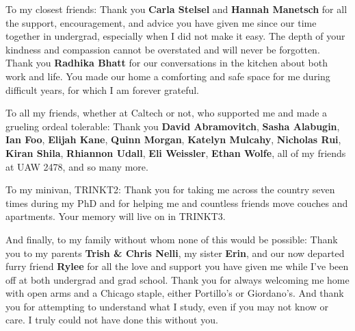 \documentclass[11pt]{caltech_thesis}
\begin{document}
\begin{acknowledgements}
  To my closest friends: Thank you \textbf{Carla Stelsel} and \textbf{Hannah
  Manetsch} for all the support, encouragement, and advice you have given me
  since our time together in undergrad, especially when I did not make it easy.
  The depth of your kindness and compassion cannot be overstated and will never
  be forgotten. Thank you \textbf{Radhika Bhatt} for our conversations in the
  kitchen about both work and life. You made our home a comforting and safe
  space for me during difficult years, for which I am forever grateful.

  To all my friends, whether at Caltech or not, who supported me and made a
  grueling ordeal tolerable: Thank you \textbf{David Abramovitch}, \textbf{Sasha
  Alabugin}, \textbf{Ian Foo}, \textbf{Elijah Kane}, \textbf{Quinn Morgan},
  \textbf{Katelyn Mulcahy}, \textbf{Nicholas Rui}, \textbf{Kiran Shila},
  \textbf{Rhiannon Udall}, \textbf{Eli Weissler}, \textbf{Ethan Wolfe}, all of
  my friends at UAW 2478, and so many more.

  To my minivan, TRINKT2: Thank you for taking me across the country seven times
  during my PhD and for helping me and countless friends move couches and
  apartments. Your memory will live on in TRINKT3.

  And finally, to my family without whom none of this would be possible: Thank
  you to my parents \textbf{Trish \& Chris Nelli}, my sister \textbf{Erin}, and
  our now departed furry friend \textbf{Rylee} for all the love and support you
  have given me while I've been off at both undergrad and grad school. Thank you
  for always welcoming me home with open arms and a Chicago staple, either
  Portillo's or Giordano's. And thank you for attempting to understand what I
  study, even if you may not know or care. I truly could not have done this
  without you.
\end{acknowledgements}
\end{document}

